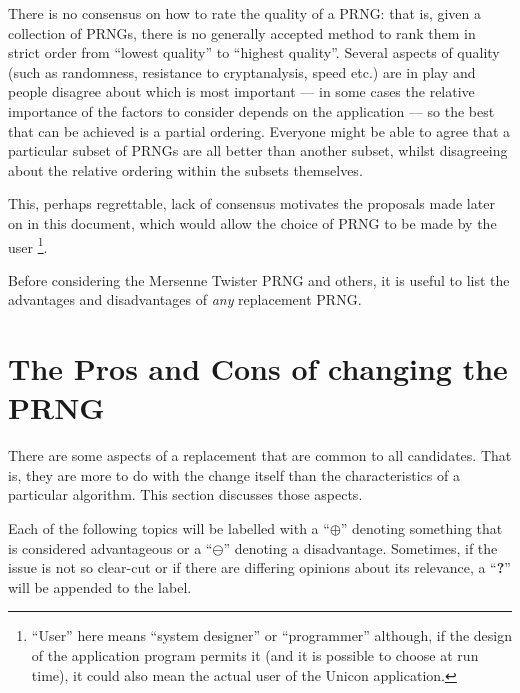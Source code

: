 \documentclass[letterpaper,12pt]{article}
\begin{document}
There is no consensus on how to rate the quality of a PRNG: that is, given
a collection of PRNGs, there is no generally accepted method to rank them in
strict order from ``lowest quality'' to ``highest quality''.
%
Several aspects of quality (such as randomness, resistance to
cryptanalysis, speed etc.)  are in play and people disagree about which is
most important --- in some cases the relative importance of the factors to
consider depends on the application --- so the best that can be achieved is
a partial ordering. Everyone might be able to agree that a particular
subset of PRNGs are all better than another subset, whilst disagreeing
about the relative ordering within the subsets themselves.

This, perhaps regrettable, lack of consensus motivates the proposals made
later on in this document, which would allow the choice of PRNG to be made
by the user%
\footnote{
  ``User'' here means ``system designer'' or ``programmer'' although, if
  the design of the application program permits it (and it is possible to
  choose at run time), it could also mean the actual user of the Unicon
  application.
}.

Before considering the Mersenne Twister PRNG and others, it is useful to
list the advantages and disadvantages of {\em any} replacement PRNG.

\section{The Pros and Cons of changing the PRNG}

There are some aspects of a replacement that are common to all
candidates. That is, they are more to do with the change itself than the
characteristics of a particular algorithm. This section discusses those
aspects.

\newcommand{\GoodThing}{\protect{\makebox[20pt][l]{$\oplus$}}}
\newcommand{\BadThing}{\protect{\makebox[20pt][l]{$\ominus$}}}
\newcommand{\PossiblyGoodThing}{\protect{\makebox[20pt][l]{$\oplus$?}}}
\newcommand{\PossiblyBadThing}{\protect{\makebox[20pt][l]{$\ominus$?}}}

Each of the following topics will be labelled with a ``$\oplus$'' denoting
something that is considered advantageous or a ``$\ominus$'' denoting a
disadvantage.  Sometimes, if the issue is not so clear-cut or if there are
differing opinions about its relevance, a ``{\bf ?}''  will be appended to
the label.
\end{document}
